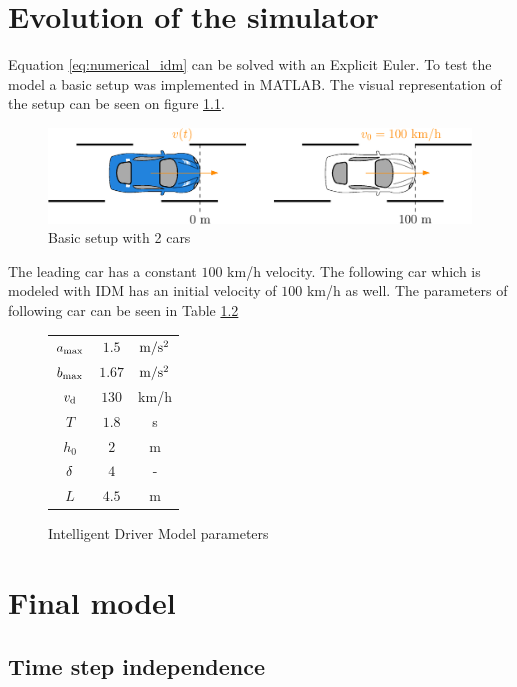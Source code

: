 \documentclass[a4paper,12pt,twoside]{report} %
\begin{document}
	\chapter{Evolution of the simulator}
			Equation \ref{eq:numerical_idm} can be solved with an Explicit Euler. To test the model a basic setup was implemented in MATLAB. The visual representation of the setup can be seen on figure \ref{fig:basic2car}.
			\begin{figure}[ht]
				\centering
				\includegraphics[width=.95\textwidth]{basic_2_car.eps}
				\caption{Basic setup with 2 cars}
				\label{fig:basic2car}
			\end{figure}
			The leading car has a constant $100$ km/h velocity. The following car which is modeled with IDM has an initial velocity of $100$ km/h as well. The parameters of following car can be seen in Table \ref{table:idm_params}
			\begin{figure}[ht]
				\begin{center}
					\begin{tabular}{ |c|c|c| }
						\hline
						$a_{\rm max}$ & $1.5$ & $\rm m/s^2$ \\
						$b_{\rm max}$ & $1.67$ & $\rm m/s^2$ \\
						$v_{\rm d}$ & $130$ & km/h \\
						$T$ & $1.8$ & s \\
						$h_0$ & $2$ & m \\
						$\rm \delta$ & $4$ & - \\
						$L$ & $4.5$ & m \\
						\hline
					\end{tabular}
				\end{center}
				\caption{Intelligent Driver Model parameters}
				\label{table:idm_params}
			\end{figure}
	\chapter{Final model}
		\section{Time step independence}
\end{document}
